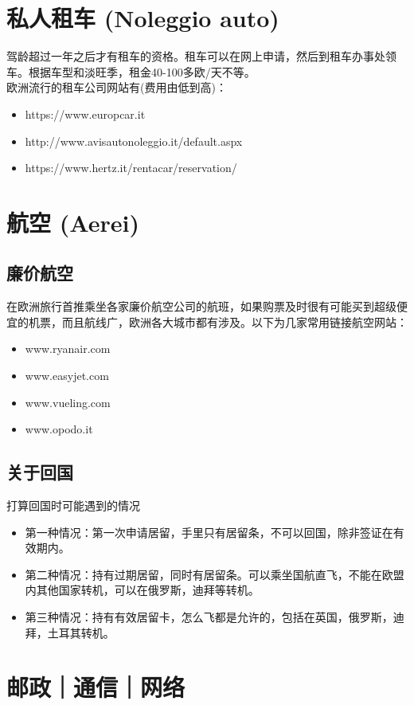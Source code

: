 \section{私人租车 (Noleggio auto)}
驾龄超过一年之后才有租车的资格。租车可以在网上申请，然后到租车办事处领车。根据车型和淡旺季，租金40-100多欧/天不等。\\
欧洲流行的租车公司网站有(费用由低到高)：
\begin{itemize}
\item https://www.europcar.it
\item http://www.avisautonoleggio.it/default.aspx 
\item https://www.hertz.it/rentacar/reservation/
\end{itemize}


\section{航空 (Aerei)}

\subsection{廉价航空}
在欧洲旅行首推乘坐各家廉价航空公司的航班，如果购票及时很有可能买到超级便宜的机票，而且航线广，欧洲各大城市都有涉及。以下为几家常用链接航空网站：
\begin{itemize}
\item www.ryanair.com
\item www.easyjet.com
\item www.vueling.com
\item www.opodo.it
\end{itemize}

\subsection{关于回国}
打算回国时可能遇到的情况
\begin{itemize}
\item 第一种情况：第一次申请居留，手里只有居留条，不可以回国，除非签证在有效期内。
\item 第二种情况：持有过期居留，同时有居留条。可以乘坐国航直飞，不能在欧盟内其他国家转机，可以在俄罗斯，迪拜等转机。
\item 第三种情况：持有有效居留卡，怎么飞都是允许的，包括在英国，俄罗斯，迪拜，土耳其转机。
\end{itemize}

\section{邮政｜通信｜网络}

